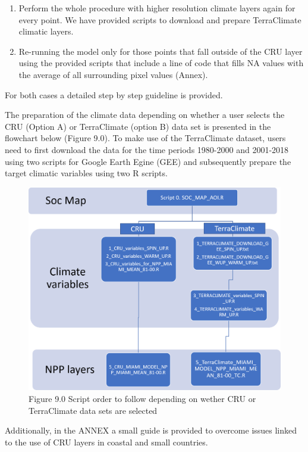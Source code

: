 \documentclass[
  10pt,
  b5paper,
]{book}
\providecommand{\tightlist}{%
  \setlength{\itemsep}{0pt}\setlength{\parskip}{0pt}}
\begin{document}
\begin{enumerate}
\def\labelenumi{\arabic{enumi}.}
\tightlist
\item
  Perform the whole procedure with higher resolution climate layers again for every point. We have provided scripts to download and prepare TerraClimate climatic layers.
\item
  Re-running the model only for those points that fall outside of the CRU layer using the provided scripts that include a line of code that fills NA values with the average of all surrounding pixel values (Annex).
\end{enumerate}

For both cases a detailed step by step guideline is provided.

The preparation of the climate data depending on whether a user selects the CRU (Option A) or TerraClimate (option B) data set is presented in the flowchart below (Figure 9.0). To make use of the TerraClimate dataset, users need to first download the data for the time periods 1980-2000 and 2001-2018 using two scripts for Google Earth Egine (GEE) and subsequently prepare the target climatic variables using two R scripts.

\begin{figure}
\centering
\includegraphics{images/Figure_9.0.png}
\caption{Figure 9.0 Script order to follow depending on wether CRU or TerraClimate data sets are selected}
\end{figure}

Additionally, in the ANNEX a small guide is provided to overcome issues linked to the use of CRU layers in coastal and small countries.
\end{document}
